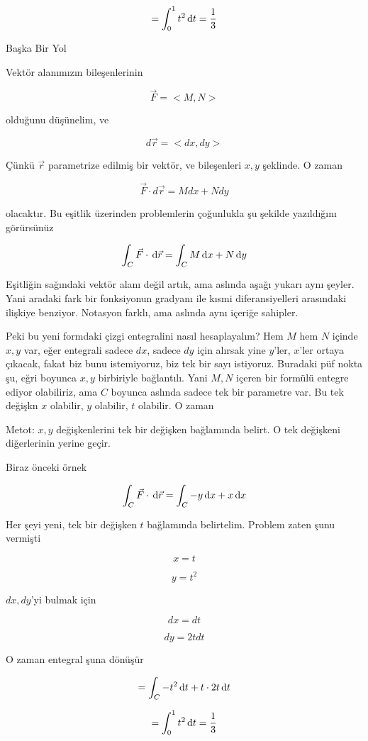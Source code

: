 \documentclass[12pt,fleqn]{article}\usepackage{../../common}
\begin{document}
$$ = \int_{0}^{1} t^2 \,\mathrm{d} t = \frac{1}{3} $$

Başka Bir Yol

Vektör alanımızın bileşenlerinin

$$ \vec{F} = <M,N> $$

olduğunu düşünelim, ve

$$ d\vec{r} = <dx, dy> $$

Çünkü $\vec{r}$ parametrize edilmiş bir vektör, ve bileşenleri $x,y$
şeklinde. O zaman

$$  \vec{F} \cdot d\vec{r}  = M dx + N dy
$$

olacaktır. Bu eşitlik üzerinden problemlerin çoğunlukla şu şekilde
yazıldığını görürsünüz

$$  \int_C \vec{F} \cdot \,\mathrm{d}\vec{r}  = \int_C M \,\mathrm{d} x + N \,\mathrm{d} y $$

Eşitliğin sağındaki vektör alanı değil artık, ama aslında aşağı yukarı aynı
şeyler. Yani aradaki fark bir fonksiyonun gradyanı ile kısmi diferansiyelleri
arasındaki ilişkiye benziyor. Notasyon farklı, ama aslında aynı içeriğe
sahipler.

Peki bu yeni formdaki çizgi entegralini nasıl hesaplayalım? Hem $M$ hem $N$
içinde $x,y$ var, eğer entegrali sadece $dx$, sadece $dy$ için alırsak yine
$y$'ler, $x$'ler ortaya çıkacak, fakat biz bunu istemiyoruz, biz tek bir
sayı istiyoruz. Buradaki püf nokta şu, eğri boyunca $x,y$ birbiriyle
bağlantılı. Yani $M,N$ içeren bir formülü entegre ediyor olabiliriz, ama
$C$ boyunca aslında sadece tek bir parametre var. Bu tek değişkn $x$
olabilir, $y$ olabilir, $t$ olabilir. O zaman 

Metot: $x,y$ değişkenlerini tek bir değişken bağlamında belirt. O tek değişkeni
diğerlerinin yerine geçir. 

Biraz önceki örnek

$$
\int_C \vec{F} \cdot \,\mathrm{d}\vec{r} 
= \int_C -y \,\mathrm{d} x + x \,\mathrm{d} x
$$

Her şeyi yeni, tek bir değişken $t$ bağlamında belirtelim. Problem zaten
şunu vermişti

$$ x = t  $$

$$ y = t^2 $$

$dx,dy$'yi bulmak için

$$ dx = dt $$

$$ dy = 2tdt $$

O zaman entegral şuna dönüşür

$$ = \int_C -t^2 \,\mathrm{d} t + t \cdot 2t \,\mathrm{d} t$$

$$ = \int_0^1 t^2 \,\mathrm{d} t = \frac{1}{3}$$
\end{document}
